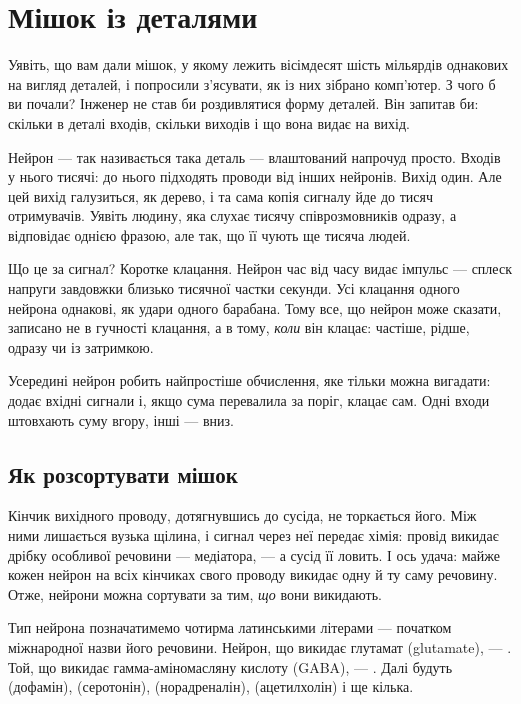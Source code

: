 \chapter{Мішок із деталями}


Уявіть, що вам дали мішок, у якому лежить вісімдесят шість мільярдів однакових на вигляд деталей, і попросили з'ясувати, як із них зібрано комп'ютер. З чого б ви почали? Інженер не став би роздивлятися форму деталей. Він запитав би: скільки в деталі входів, скільки виходів і що вона видає на вихід.

Нейрон --- так називається така деталь --- влаштований напрочуд просто. Входів у нього тисячі: до нього підходять проводи від інших нейронів. Вихід один. Але цей вихід галузиться, як дерево, і та сама копія сигналу йде до тисяч отримувачів. Уявіть людину, яка слухає тисячу співрозмовників одразу, а відповідає однією фразою, але так, що її чують ще тисяча людей.

Що це за сигнал? Коротке клацання. Нейрон час від часу видає імпульс --- сплеск напруги завдовжки близько тисячної частки секунди. Усі клацання одного нейрона однакові, як удари одного барабана. Тому все, що нейрон може сказати, записано не в гучності клацання, а в тому, \emph{коли} він клацає: частіше, рідше, одразу чи із затримкою.

Усередині нейрон робить найпростіше обчислення, яке тільки можна вигадати: додає вхідні сигнали і, якщо сума перевалила за поріг, клацає сам. Одні входи штовхають суму вгору, інші --- вниз.

\section*{Як розсортувати мішок}

Кінчик вихідного проводу, дотягнувшись до сусіда, не торкається його. Між ними лишається вузька щілина, і сигнал через неї передає хімія: провід викидає дрібку особливої речовини --- медіатора, --- а сусід її ловить. І ось удача: майже кожен нейрон на всіх кінчиках свого проводу викидає одну й ту саму речовину. Отже, нейрони можна сортувати за тим, \emph{що} вони викидають.

Тип нейрона позначатимемо чотирма латинськими літерами --- початком міжнародної назви його речовини. Нейрон, що викидає глутамат (glutamate), --- . Той, що викидає гамма-аміномасляну кислоту (GABA), --- . Далі будуть  (дофамін),  (серотонін),  (норадреналін),  (ацетилхолін) і ще кілька.

